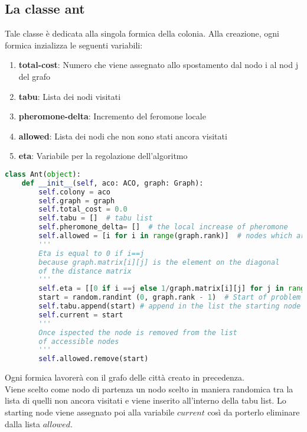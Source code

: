 \documentclass[a4paper,12pt]{report}
\begin{document}
\subsection{La classe ant}
Tale classe è dedicata alla singola formica della colonia.
Alla creazione, ogni formica inzializza le seguenti variabili:\\
\begin{enumerate}
    \item \textbf{total-cost}: Numero che viene assegnato allo spostamento dal nodo i al nod j del grafo
    \item \textbf{tabu}: Lista dei nodi visitati
    \item \textbf{pheromone-delta}: Incremento del feromone locale
    \item \textbf{allowed}: Lista dei nodi che non sono stati ancora visitati
    \item \textbf{eta}: Variabile per la regolazione dell'algoritmo
\end{enumerate}
\begin{lstlisting}[language=Python]
class Ant(object):
    def __init__(self, aco: ACO, graph: Graph):
        self.colony = aco
        self.graph = graph
        self.total_cost = 0.0
        self.tabu = []  # tabu list
        self.pheromone_delta= []  # the local increase of pheromone
        self.allowed = [i for i in range(graph.rank)]  # nodes which are allowed for the next selection
        '''
        Eta is equal to 0 if i==j
        because graph.matrix[i][j] is the element on the diagonal
        of the distance matrix
        '''
        self.eta = [[0 if i ==j else 1/graph.matrix[i][j] for j in range(graph.rank)] for i in range(graph.rank)]
        start = random.randint (0, graph.rank - 1)  # Start of problem
        self.tabu.append(start) # append in the list the starting node
        self.current = start
        '''
        Once ispected the node is removed from the list
        of accessible nodes 
        '''
        self.allowed.remove(start)
\end{lstlisting}
Ogni formica lavorerà con il grafo delle città creato in precedenza.\\
Viene scelto come nodo di partenza un nodo scelto in maniera randomica tra la lista di quelli non ancora visitati e viene inserito all'interno della tabu list. Lo starting node viene assegnato poi alla variabile $current$ così da porterlo eliminare dalla lista $allowed$.\\
\end{document}
